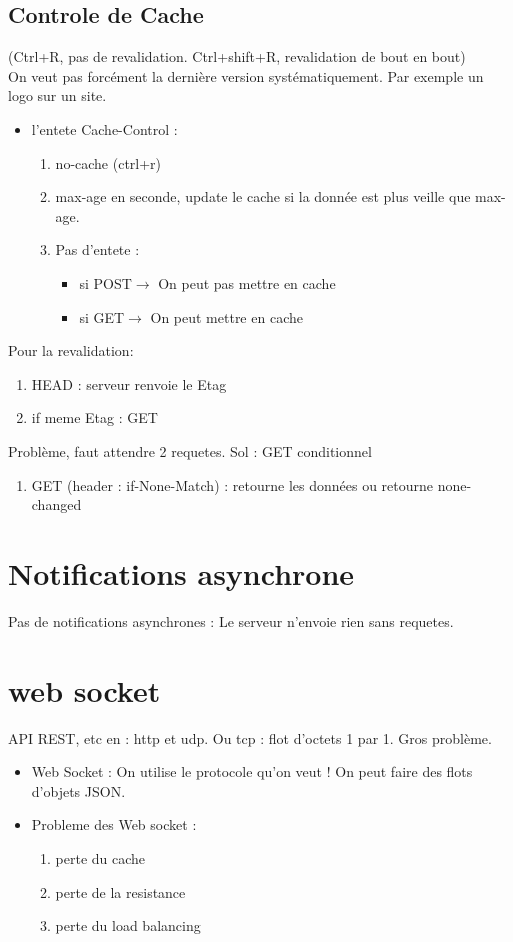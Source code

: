 \documentclass[12pt]{article}
\theoremstyle{plain}
\theoremstyle{definition}
\theoremstyle{remark}
\begin{document}
\subsection{Controle de Cache}
(Ctrl+R, pas de revalidation. Ctrl+shift+R, revalidation de bout en bout)\\
On veut pas forcément la dernière version systématiquement. Par exemple un logo sur un site.
\begin{itemize}
    \item l'entete Cache-Control : \begin{enumerate}
        \item no-cache (ctrl+r)
        \item max-age en seconde, update le cache si la donnée est plus veille que max-age.
        \item Pas d'entete : \begin{itemize}
            \item si POST$\rightarrow$ On peut pas mettre en cache
            \item si GET$\rightarrow$ On peut mettre en cache
        \end{itemize}
    \end{enumerate}
\end{itemize}

Pour la revalidation:
\begin{enumerate}
    \item HEAD : serveur renvoie le Etag
    \item if meme Etag : GET
\end{enumerate}
Problème, faut attendre 2 requetes. Sol : GET conditionnel
\begin{enumerate}
    \item GET (header : if-None-Match) : retourne les données ou retourne none-changed
\end{enumerate}



\section{Notifications asynchrone}
Pas de notifications asynchrones : Le serveur n'envoie rien sans requetes.

\section{web socket}
API REST, etc en : http et udp. Ou tcp : flot d'octets 1 par 1. Gros problème.
\begin{itemize}
    \item Web Socket : On utilise le protocole qu'on veut ! On peut faire des flots d'objets JSON.
    \item Probleme des Web socket :\begin{enumerate}
        \item perte du cache
        \item perte de la resistance
        \item perte du load balancing
    \end{enumerate}
\end{itemize}
\end{document}
